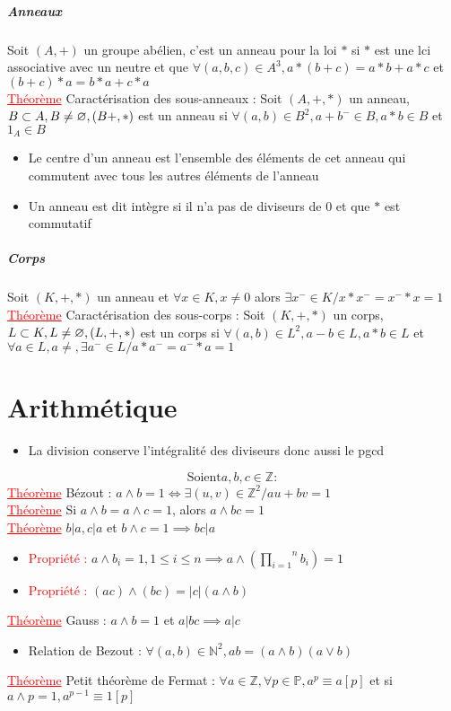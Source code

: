 \documentclass[a4paper, 11pt, french]{article}
\newcommand{\N}{\mathbb{N}}
\newcommand{\Z}{\mathbb{Z}}
\newcommand{\p}{\wedge}
\newcommand{\produit}[2]{\overset{#2}{\underset{#1}{\prod}}}
\newcommand{\thm}{\textcolor{red}{\underline{Théorème} }}
\newcommand{\ppt}{\textcolor{red}{Propriété : }}
\begin{document}
	\subparagraph*{Anneaux}
	Soit $(A,+)$ un groupe abélien, c'est un anneau pour la loi $*$ si $*$ est une lci associative avec un neutre et que $\forall (a,b,c)\in A^3, a*(b+c)=a*b+a*c$ et $ (b+c)*a=b*a+c*a$ \\
	 \thm Caractérisation des sous-anneaux : Soit $(A,+,*)$ un anneau, $B \subset A, B\neq \varnothing, \\ (B+,*)$ est un anneau si $\forall (a,b) \in B^2, a+b^-\in B, a*b \in B$ et $1_A \in B$
	\begin{itemize}
	  \item Le centre d'un anneau est l'ensemble des éléments de cet anneau qui commutent avec tous les autres éléments de l'anneau
	  \item Un anneau est dit intègre si il n'a pas de diviseurs de 0 et que $*$ est commutatif
	\end{itemize}

	\subparagraph*{Corps}
	Soit $(K,+,*)$ un anneau et $\forall x \in K, x\neq0$ alors $\exists x^- \in K / x*x^-=x^-*x=1$
	\thm Caractérisation des sous-corps : Soit $(K,+,*)$ un corps, $L \subset K, L\neq \varnothing, \\ (L,+,*)$ est un corps si $\forall (a,b) \in L^2, a-b \in L, a*b \in L$ et $\forall a\in L, a\neq, \exists a^- \in L / a*a^-=a^-*a=1$

	\section*{Arithmétique}
	\begin{itemize}
	  \item La division conserve l'intégralité des diviseurs donc aussi le pgcd
	\end{itemize}
	$$\text{Soient} a,b,c \in \Z :$$
	 \thm Bézout : $a \p b=1 \iff \exists (u,v) \in \Z^2 / au+bv=1$ \\
	 \thm Si $a \p b= a \p c = 1$, alors $a \p bc =1$ \\
	 \thm $b|a, c|a$ et $b\p c =1 \implies bc|a$
	\begin{itemize}
	  \item \ppt $a \p b_i=1, 1 \leqslant i \leqslant n \implies a\p (\produit{i=1}{n} b_i)=1$
	  \item \ppt $(ac)\p(bc)=|c|(a \p b)$
	\end{itemize}
	 \thm Gauss : $a \p b = 1$ et $a|bc \implies a|c$
	\begin{itemize}
	  \item Relation de Bezout : $\forall (a,b) \in \N^2, ab=(a \p b)(a \vee b)$
	\end{itemize}
	 \thm Petit théorème de Fermat : $\forall a \in \Z, \forall p \in \mathbb{P}, a^p \equiv a[p]$ et si $a \p p=1, a^{p-1} \equiv 1[p]$
\end{document}

